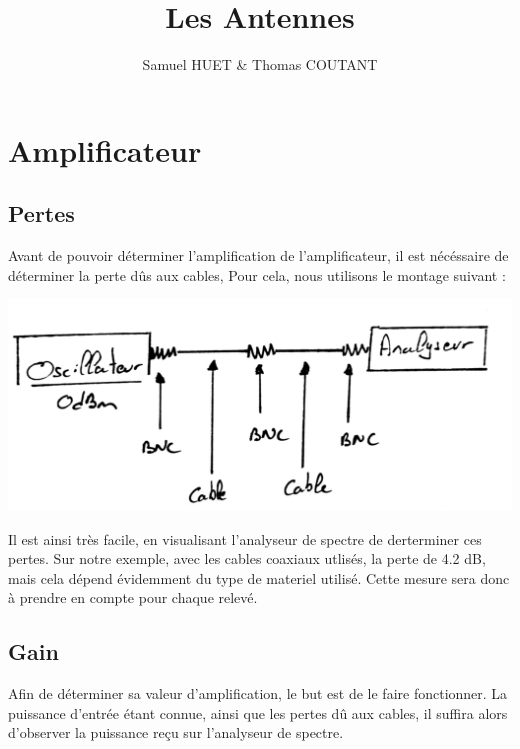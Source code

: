 \documentclass[a4paper,12pt]{report}            %
\author{Samuel HUET \& Thomas COUTANT}
\title{\huge{Les Antennes}}
\begin{document}
\maketitle
\renewcommand{\contentsname}{SOMMAIRE} %
\tableofcontents

\chapter{Amplificateur}

\section{Pertes}

Avant de pouvoir déterminer l'amplification de l'amplificateur, il est nécéssaire de déterminer la perte dûs aux cables, 
Pour cela, nous utilisons le montage suivant :

\begin{center}\includegraphics[scale = 0.2]{pic/mesure_perte.png}\\ \end{center}

Il est ainsi très facile, en visualisant l'analyseur de spectre de derterminer ces pertes.
Sur notre exemple, avec les cables coaxiaux utlisés, la perte de 4.2 dB, mais cela dépend évidemment du type de
materiel utilisé. Cette mesure sera donc à prendre en compte pour chaque relevé.

\section{Gain}

Afin de déterminer sa valeur d'amplification, le but est de le faire fonctionner. La puissance d'entrée étant
connue, ainsi que les pertes dû aux cables, il suffira alors d'observer la puissance reçu sur
l'analyseur de spectre.
\end{document}
